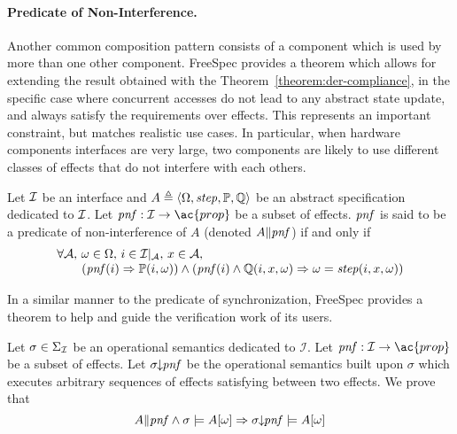 \paragraph{Predicate of Non-Interference.}
%
Another common composition pattern consists of a component which is used by more
than one other component. 
%
FreeSpec provides a theorem which allows for extending the result obtained with
the Theorem~\ref{theorem:der-compliance}, in the specific case where concurrent
accesses do not lead to any abstract state update, and always satisfy the
requirements over effects.
%
This represents an important constraint, but matches realistic use cases.
%
In particular, when hardware components interfaces are very large, two
components are likely to use different classes of effects that do not interfere
with each others.

\begin{definition}
  Let $\mathcal{I}$ be an interface and
  $A \triangleq \langle \Omega, \mathit{step}, \mathbb{P}, \mathbb{Q} \rangle$ be
  an abstract specification dedicated to $\mathcal{I}$. Let
  $\func{pnf} : \I \rightarrow \ac{prop}$ be a subset of effects. $\mathit{pnf}$
  is said to be a predicate of non-interference of $A$ (denoted
  $A \| \mathit{pnf}$) if and only if \[
    \begin{array}{l}
      \forall \mathcal{A}\text{, } \omega \in \Omega\text{, } i \in
      \mathcal{I}|_{\mathcal{A}}\text{, }x \in \mathcal{A}\text{, } \\ \qquad
      (\mathit{pnf}(i) \Rightarrow \mathbb{P}(i, \omega)) \wedge (\mathit{pnf}(i)
      \wedge \mathbb{Q}(i, x, \omega) \Rightarrow \omega = \mathit{step}(i, x,
      \omega))
    \end{array}
  \]
\end{definition}

In a similar manner to the predicate of synchronization, FreeSpec provides a
theorem to help and guide the verification work of its users.

\begin{theorem}
  Let $\sigma \in \Sigma_{\mathcal{I}}$ be an operational semantics dedicated to
  \( \mathcal{I}\).
  Let \( \func{pnf} : \I \rightarrow \ac{prop} \) be a subset of effects. Let
  \( \sigma\!\!\downarrow\!\!\mathit{pnf} \) be the operational semantics built
  upon \( \sigma \) which executes arbitrary sequences of effects satisfying
   between two effects.
  We prove that
  \[
    A \| \mathit{pnf} \wedge \sigma \models A[\omega] \Rightarrow
    \sigma\!\!\downarrow\!\!\mathit{pnf} \models A[\omega]
  \]
\end{theorem}

